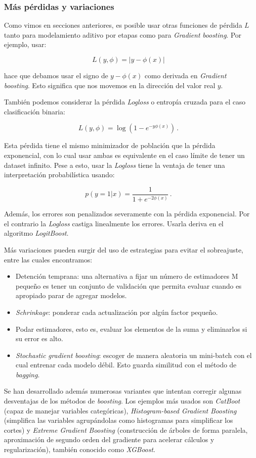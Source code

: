 \subsubsection{Más pérdidas y variaciones}

Como vimos en secciones anteriores, es posible usar otras funciones de pérdida $L$ tanto para modelamiento aditivo por etapas como para \textit{Gradient boosting}. Por ejemplo, usar:

$$ L(y,\phi) = |y - \phi(x)| $$

hace que debamos usar el signo de $y - \phi(x)$ como derivada en \textit{Gradient boosting}. Esto significa que nos movemos en la dirección del valor real $y$.

También podemos considerar la pérdida \textit{Logloss} o entropía cruzada para el caso clasificación binaria:

$$ L(y,\phi) = \log(1 - e^{-y\phi(x)}) \,. $$

Esta pérdida tiene el mismo minimizador de población que la pérdida exponencial, con lo cual usar ambas es equivalente en el caso límite de tener un dataset infinito. Pese a esto, usar la \textit{Logloss} tiene la ventaja de tener una  interpretación probabilística usando:

$$ p(y=1|x) = \frac{1}{1+e^{-2\phi(x)}} \,.$$

Además, los errores son penalizados severamente con la pérdida exponencial. Por el contrario la \textit{Logloss} castiga linealmente los errores. Usarla deriva en el algoritmo \textit{LogitBoost}.

Más variaciones pueden surgir del uso de estrategias para evitar el sobreajuste, entre las cuales encontramos:

\begin{itemize}
    \item Detención temprana: una alternativa a fijar un número de estimadores M pequeño es tener un conjunto de validación que permita evaluar cuando es apropiado parar de agregar modelos.

    \item \textit{Schrinkage}: ponderar cada actualización por algún factor pequeño.

    \item Podar estimadores, esto es, evaluar los elementos de la suma y eliminarlos si su error es alto.

    \item \textit{Stochastic gradient boosting}: escoger de manera aleatoria un mini-batch con el cual entrenar cada modelo débil. Esto guarda similitud con el método de \textit{bagging}.
\end{itemize}

Se han desarrollado además numerosas variantes que intentan corregir algunas desventajas de los métodos de \textit{boosting}. Los ejemplos más usados son \textit{CatBoot} (capaz de manejar variables categóricas), \textit{Histogram-based Gradient Boosting} (simplifica las variables agrupándolas como histogramas para simplificar los cortes) y \textit{Extreme Gradient Boosting} (construcción de árboles de forma paralela, aproximación de segundo orden del gradiente para acelerar cálculos y regularización), también conocido como \textit{XGBoost}.
